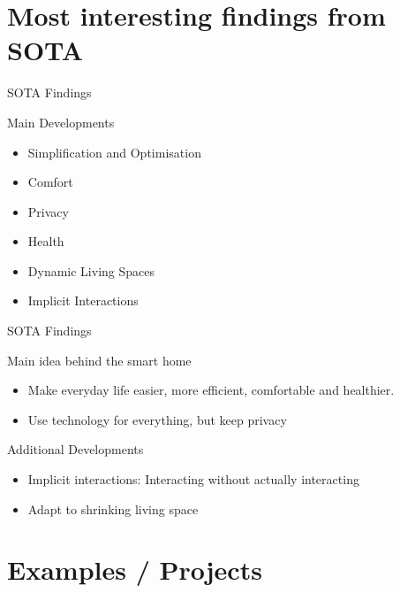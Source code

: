 \documentclass[10pt]{beamer}
\begin{document}

\section{Most interesting findings from SOTA}


\begin{frame}{SOTA Findings}
	\begin{block}{Main Developments}
	\begin{itemize}
		\item Simplification and Optimisation
		\item Comfort
		\item Privacy
		\item Health
		\item Dynamic Living Spaces
		\item Implicit Interactions
	\end{itemize}	
	\end{block}
\end{frame}


\begin{frame}{SOTA Findings}
	\begin{block}{Main idea behind the smart home}
		\begin{itemize}
		\item Make everyday life easier, more efficient, comfortable and healthier.
		\item Use technology for everything, but keep privacy
		\end{itemize}
	\end{block}

	\begin{exampleblock}{Additional Developments}
	\begin{itemize}
		\item Implicit interactions: Interacting without actually interacting
		\item Adapt to shrinking living space
	\end{itemize}
\end{exampleblock}
	
\end{frame}


\section{Examples / Projects}
\end{document}
